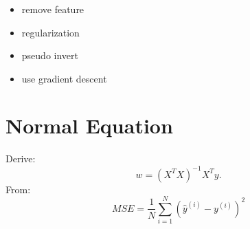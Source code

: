 \documentclass{article}
\begin{document}
\subsubsection*{}
\begin{itemize}
    \item remove feature
    \item regularization
    \item pseudo invert
    \item use gradient descent
\end{itemize}
\section*{Normal Equation}
\noindent Derive:
\begin{equation}
  w = (X^T X)^{-1} X^T y.
\end{equation}
From:
\begin{equation}
    MSE = \frac{1}{N} \sum_{i=1}^{N}(\hat{y}^{(i)} - y^{(i)})^2 
\end{equation}
\end{document}
